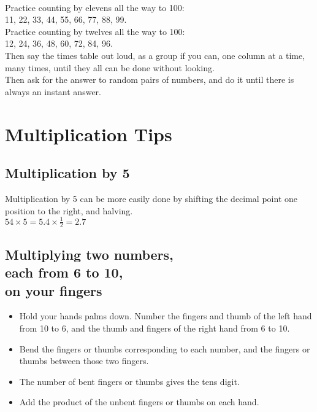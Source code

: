 \documentclass{article}
\begin{document}
\begin{spacing}{1.25}
\\
Practice counting by elevens all the way to 100:\\
11, 22, 33, 44, 55, 66, 77, 88, 99.\\

Practice counting by twelves all the way to 100:\\
12, 24, 36, 48, 60, 72, 84, 96.\\

Then say the times table out loud, as a group if you can, one column at a time, many times, until they all can be done without looking.\\

Then ask for the answer to random pairs of numbers, and do it until there is always an instant answer.\\

\newpage

\section{Multiplication Tips}

\subsection*{Multiplication by 5}
Multiplication by 5 can be more easily done by shifting the decimal point one position to the right, and halving.\\

$54 \times 5 = 5.4 \times \frac{1}{2} = 2.7$

\subsection*{Multiplying two numbers,\\each from 6 to 10,\\on your fingers}

\begin{itemize}
\item Hold your hands palms down. Number the fingers and thumb of the left hand from 10 to 6, and the thumb and fingers of the right hand from 6 to 10.
\item Bend the fingers or thumbs corresponding to each number, and the fingers or thumbs between those two fingers.
\item The number of bent fingers or thumbs gives the tens digit.
\item Add the product of the unbent fingers or thumbs on each hand.
\end{itemize}


\end{spacing}
\end{document}
